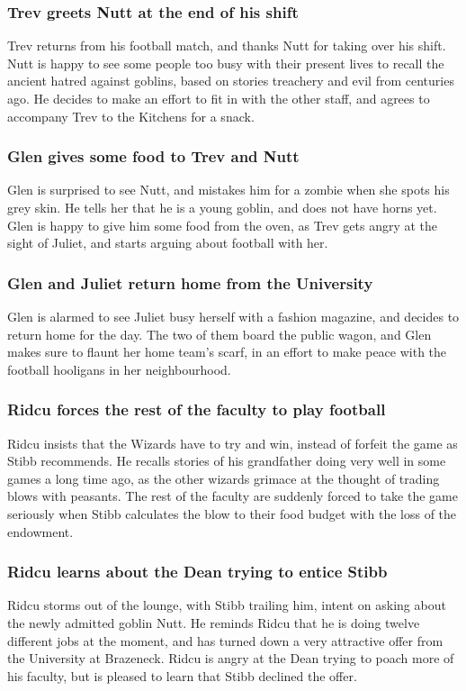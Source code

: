 \subsubsection{\Gls{Trev} greets \Gls{Nutt} at the end of his shift}
\Gls{Trev} returns from his football match, and thanks \Gls{Nutt} for taking over his shift.
\Gls{Nutt} is happy to see some people too busy with their present lives to recall the ancient
hatred against goblins, based on stories treachery and evil from centuries ago. He decides to make
an effort to fit in with the other staff, and agrees to accompany \Gls{Trev} to the Kitchens for a
snack.

\subsubsection{\Gls{Glen} gives some food to \Gls{Trev} and \Gls{Nutt}}
\Gls{Glen} is surprised to see \Gls{Nutt}, and mistakes him for a zombie when she spots his grey
skin. He tells her that he is a young goblin, and does not have horns yet. \Gls{Glen} is happy to
give him some food from the oven, as \Gls{Trev} gets angry at the sight of \Gls{Juliet}, and starts
arguing about football with her.

\subsubsection{\Gls{Glen} and \Gls{Juliet} return home from the University}
\Gls{Glen} is alarmed to see \Gls{Juliet} busy herself with a fashion magazine, and decides to
return home for the day. The two of them board the public wagon, and \Gls{Glen} makes sure to
flaunt her home team's scarf, in an effort to make peace with the football hooligans in her
neighbourhood.

\subsubsection{\Gls{Ridcu} forces the rest of the faculty to play football}
\Gls{Ridcu} insists that the Wizards have to try and win, instead of forfeit the game as \Gls{Stibb}
recommends. He recalls stories of his grandfather doing very well in some games a long time ago, as
the other wizards grimace at the thought of trading blows with peasants. The rest of the faculty are
suddenly forced to take the game seriously when \Gls{Stibb} calculates the blow to their food
budget with the loss of the endowment.

\subsubsection{\Gls{Ridcu} learns about the \Gls{Dean} trying to entice \Gls{Stibb}}
\Gls{Ridcu} storms out of the lounge, with \Gls{Stibb} trailing him, intent on asking about the
newly admitted goblin \Gls{Nutt}. He reminds \Gls{Ridcu} that he is doing twelve different jobs at
the moment, and has turned down a very attractive offer from the University at Brazeneck.
\Gls{Ridcu} is angry at the \Gls{Dean} trying to poach more of his faculty, but is pleased to learn
that \Gls{Stibb} declined the offer.

